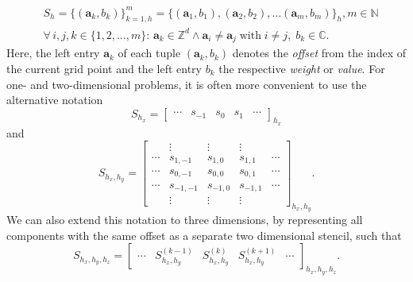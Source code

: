 \begin{equation}
	\begin{split}
			& S_h = \{(\bm{a}_k, b_k) \}_{k=1, h}^m = \{(\bm{a}_1, b_1),  (\bm{a}_2, b_2), \dots (\bm{a}_m, b_m)\}_h, m \in \mathbb{N}
	\\ & \forall \, i, j, k \in \{1, 2, \dots, m \}: \,
	\bm{a}_k \in \mathbb{Z}^d \wedge \bm{a}_i \neq \bm{a}_j \; \text{with} \; i \neq j, \; b_k \in \mathbb{C}.
	\end{split}
\label{eq:stencil-definition}
\end{equation}
Here, the left entry $\bm{a}_k$ of each tuple $(\bm{a}_k, b_k)$ denotes the \emph{offset} from the index of the current grid point and the left entry $b_k$ the respective \emph{weight} or \emph{value}.
For one- and two-dimensional problems, it is often more convenient to use the alternative notation 
\begin{equation}
	S_{h_x} = \begin{bmatrix}
		\cdots & s_{-1} & s_{0} & s_{1} & \cdots
	\end{bmatrix}_{h_x}
\end{equation}
and
\begin{equation}
	S_{h_x, h_y} = \begin{bmatrix}
		& \vdots & \vdots & \vdots & \\
		\cdots & s_{1,-1} & s_{1,0} & s_{1,1} & \cdots \\
		\cdots & s_{0,-1} & s_{0,0} & s_{0,1} & \cdots \\
		\cdots & s_{-1,-1} & s_{-1,0} & s_{-1,1} & \cdots \\
		& \vdots & \vdots & \vdots &
	\end{bmatrix}_{h_x, h_y}.
\end{equation}
We can also extend this notation to three dimensions, by representing all components with the same offset as a separate two dimensional stencil, such that
\begin{equation}
	S_{h_x, h_y, h_z} = 
	\begin{bmatrix}
		\cdots & S_{h_x, h_y}^{(k-1)} & S_{h_x, h_y}^{(k)} & S_{h_x, h_y}^{(k+1)} & \cdots 
	\end{bmatrix}_{h_x, h_y, h_z}.
\label{eq:3D-stencil-matrix-notation}
\end{equation}

